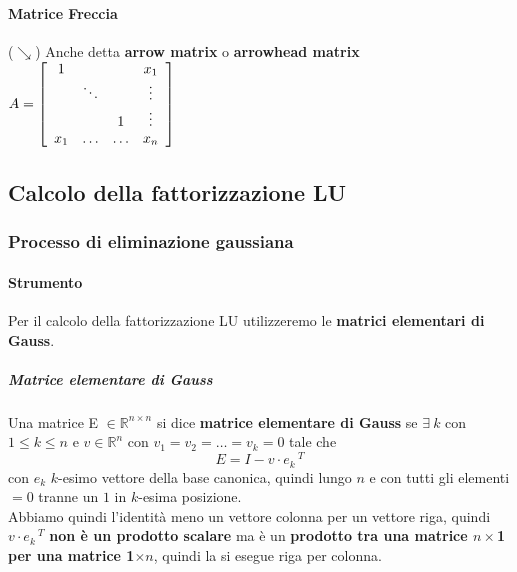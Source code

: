 \documentclass[10pt]{book}
\begin{document}
\paragraph{Matrice Freccia} ($\searrow$) Anche detta \textbf{arrow matrix} o \textbf{arrowhead matrix} \begin{math}
A = \left[
\begin{array}{c c c c}
	1 & & & x_1\\
	& \ddots & & \vdots\\
	& & 1 & \vdots\\
	x_1 & \ldots & \ldots & x_n
\end{array}
\right]
\end{math}
\subsection{Calcolo della fattorizzazione LU}
\subsubsection{Processo di eliminazione gaussiana}
\paragraph{Strumento} Per il calcolo della fattorizzazione LU utilizzeremo le \textbf{matrici elementari di Gauss}.
\subparagraph{Matrice elementare di Gauss} Una matrice E $\in \mathbb{R}^{n\times n}$ si dice \textbf{matrice elementare di Gauss} se $\exists\: k$ con $1 \leq k \leq n$ e $v \in \mathbb{R}^n$ con $v_1 = v_2 = \ldots = v_k = 0$ tale che $$E = I - v\cdot e_k\,^T$$
con $e_k$ $k$-esimo vettore della base canonica, quindi lungo $n$ e con tutti gli elementi $= 0$ tranne un $1$ in $k$-esima posizione.\\
Abbiamo quindi l'identità meno un vettore colonna per un vettore riga, quindi $v\cdot e_k\,^T$ \textbf{non è un prodotto scalare} ma è un \textbf{prodotto tra una matrice $n\times$1 per una matrice 1$\times n$}, quindi la si esegue riga per colonna.
\pagebreak
\end{document}
